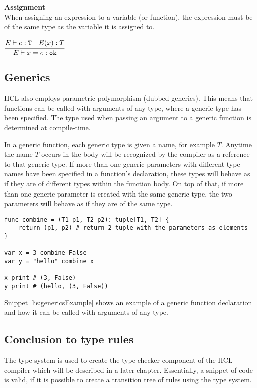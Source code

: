 \textbf{Assignment}\\
When assigning an expression to a variable (or function), the expression must be of the same type as the variable it is assigned to.

\begin{center}
	\begin{math}
	\cfrac
	{E\vdash e : \texttt{T}\quad E(x) : T}
	{E \vdash x = e : \texttt{ok}}
	\end{math}
\end{center}

\subsection{Generics}
HCL also employs parametric polymorphism (dubbed generics).
This means that functions can be called with arguments of any type, where a generic type has been specified.
The type used when passing an argument to a generic function is determined at compile-time.

In a generic function, each generic type is given a name, for example $T$.
Anytime the name $T$ occurs in the body will be recognized by the compiler as a reference to that generic type.
If more than one generic parameters with different type names have been specified in a function's declaration, these types will behave as if they are of different types within the function body.
On top of that, if more than one generic parameter is created with the same generic type, the two parameters will behave as if they are of the same type.

\begin{lstlisting}[language=HCL,label=lis:genericsExample,caption=An example of a generic function declaration.]
func combine = (T1 p1, T2 p2): tuple[T1, T2] {
	return (p1, p2) # return 2-tuple with the parameters as elements
}

var x = 3 combine False
var y = "hello" combine x

x print # (3, False)
y print # (hello, (3, False))
\end{lstlisting}

Snippet \ref{lis:genericsExample} shows an example of a generic function declaration and how it can be called with arguments of any type.

\subsection{Conclusion to type rules}
The type system is used to create the type checker component of the HCL compiler which will be described in a later chapter.
Essentially, a snippet of code is valid, if it is possible to create a transition tree of rules using the type system. 

